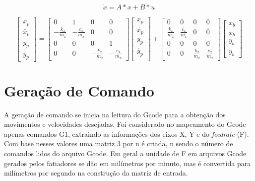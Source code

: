 \begin{equation}
    \label{eq:simp_state_space_din_model}
    \dot x = A*x+B*u
\end{equation}

\begin{equation}
    \label{eq:espaco_de_estados_din_model}
    \begin{bmatrix}
        \dot{x_p} \\
        \ddot{x_p} \\
        \dot{y_p} \\
        \ddot{y_p}
    \end{bmatrix}
    =
    \begin{bmatrix}
        0 & 1 & 0 & 0 \\
        -\frac{k_x}{m_x} & -\frac{c_x}{m_x} & 0 & 0 \\
        0 & 0 & 0 & 1 \\
        0 & 0 & -\frac{k_x}{m_x} & -\frac{c_x}{m_x}
    \end{bmatrix}
    \begin{bmatrix}
        x_p \\
        \dot{x_p} \\        
        y_p \\
        \dot{y_p} \\
    \end{bmatrix}
    +
    \begin{bmatrix}
        0 & 0 & 0 & 0 \\
        \frac{k_x}{m_x} & \frac{c_x}{m_x} & 0 & 0 \\
        0 & 0 & 0 & 0 \\
        0 & 0 & \frac{k_x}{m_x} & \frac{c_x}{m_x}
    \end{bmatrix}
    \begin{bmatrix}
        x_b \\
        \dot{x_b}  \\
        y_b \\
        \dot{y_b} 
    \end{bmatrix}
\end{equation}

\section{Geração de Comando}

A geração de comando se inicia na leitura do Gcode para a obtenção dos movimentos e velocidades desejadas. Foi considerado no mapeamento do Gcode apenas comandos G1, extraindo as informações dos eixos X, Y e do \textit{feedrate} (F). Com base nesses valores uma matriz 3 por n é criada, n sendo o número de comandos lidos do arquivo Gcode. Em geral a unidade de F em arquivos Gcode gerados pelos fatiadores se dão em milímetros por minuto, mas é convertida para milímetros por segundo na construção da matriz de entrada.

